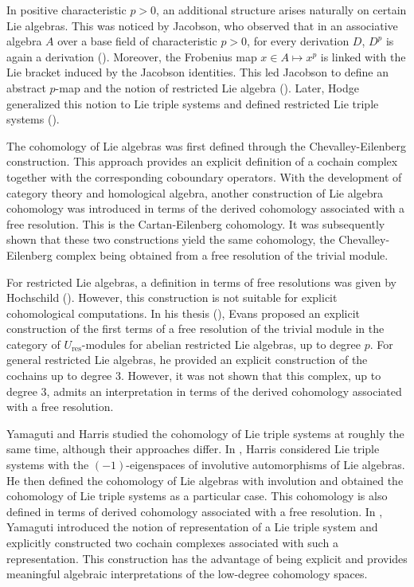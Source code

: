 \documentclass[11pt, twoside]{article}
\begin{document}
In positive characteristic $p>0$, an additional structure arises naturally on certain Lie algebras. This was noticed by Jacobson, who observed that in an associative algebra $A$ over a base field of characteristic $p>0$, for every derivation $D$, $D^p$ is again a derivation (\cite{J37}). Moreover, the Frobenius map $x\in A\mapsto x^p$ is linked with the Lie bracket induced by the Jacobson identities. This led Jacobson to define an abstract $p$-map and the notion of  restricted Lie algebra (\cite{J41}). Later, Hodge generalized this notion to Lie triple systems and defined restricted Lie triple systems (\cite{H01}).

The cohomology of Lie algebras was first defined through the Chevalley-Eilenberg construction. This approach provides an explicit definition of a cochain complex together with the corresponding coboundary operators. With the development of category theory and homological algebra, another construction of Lie algebra cohomology was introduced in terms of the derived cohomology associated with a free resolution. This is the Cartan-Eilenberg cohomology. It was subsequently shown that these two constructions yield the same cohomology, the Chevalley-Eilenberg complex being obtained from a free resolution of the trivial module.

For restricted Lie algebras, a definition in terms of free resolutions was given by Hochschild (\cite{H54}). However, this construction is not suitable for explicit cohomological computations. In his thesis (\cite{E96}), Evans proposed an explicit construction of the first terms of a free resolution of the trivial module in the category of $U_{\mathrm{res}}$-modules for abelian restricted Lie algebras, up to degree $p$. For general restricted Lie algebras, he provided an explicit construction of the cochains up to degree $3$. However, it was not shown that this complex, up to degree $3$, admits an interpretation in terms of the derived cohomology associated with a free resolution.

Yamaguti and Harris studied the cohomology of Lie triple systems at roughly the same time, although their approaches differ. In \cite{H60}, Harris considered Lie triple systems with the $(-1)$-eigenspaces of involutive automorphisms of Lie algebras. He then defined the cohomology of Lie algebras with involution and obtained the cohomology of Lie triple systems as a particular case. This cohomology is also defined in terms of derived cohomology associated with a free resolution. In \cite{Y60}, Yamaguti introduced the notion of  representation of a Lie triple system and explicitly constructed two cochain complexes associated with such a representation. This construction has the advantage of being explicit and provides meaningful algebraic interpretations of the low-degree cohomology spaces.
\end{document}
